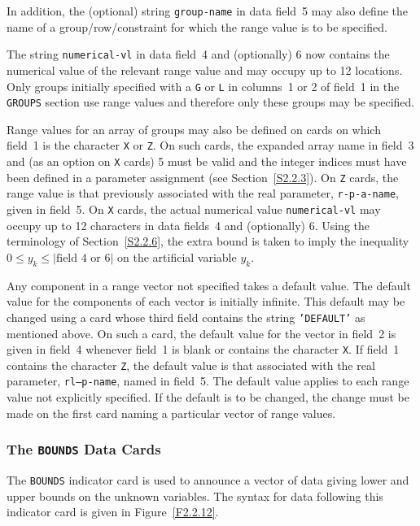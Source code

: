 \documentclass[a4paper]{article}
\begin{document}
In addition, the  (optional) string {\tt  group-name} in data field~5
may also define the name of a group/row/constraint
for which the range value is to be specified.

The string {\tt numerical-vl} in  data field~4 and (optionally) 6 now
contains the  numerical  value of the  relevant   range value and  may
occupy up to 12 locations.
Only groups initially specified with a {\tt G} or {\tt L} in columns~1
or 2 of  field~1 in  the {\tt  GROUPS}
section  use range  values
and therefore   only  these groups may  be specified.

Range values for an array
of groups may  also be  defined on cards
on which field~1 is the character {\tt X} or {\tt  Z}.  On such cards,
the expanded array name
in field~3 and (as an option  on  {\tt X} cards) 5
must be  valid  and the integer indices  must  have been defined  in a
parameter assignment (see Section~\ref{S2.2.3}).   On {\tt Z}  cards,
the range value
is that previously associated with the real parameter,
{\tt  r-p-a-name}, given in field~5.   On {\tt X} cards, the actual
numerical value {\tt numerical-vl} may occupy up to 12  characters in
data    fields~4 and (optionally)     6.  Using  the    terminology of
Section~\ref{S2.2.6}, the extra bound
is taken to imply the inequality
$0 \leq  y_k  \leq |\mbox{field~4 or  6}|$ on the  artificial variable
$y_k$.

Any component in  a range vector  not specified takes a default value.
The default   value for the components  of  each vector   is initially
infinite. This default may be changed  using  a card
whose third field
contains the string  {\tt 'DEFAULT'} as mentioned above.   On  such  a
card, the default value for the vector in field~2  is given in field~4
whenever field~1  is blank
or contains the   character {\tt  X}.  If
field~1  contains the  character  {\tt Z}, the default
value  is that
associated with the   real  parameter,
{\tt  rl--p-name}, named  in
field~5.  The default value applies to each range value
not explicitly
specified.  If the default is to be  changed, the  change must be made
on the first card
naming a particular vector of range values.

\subsubsection{\label{S2.2.12}The {\tt BOUNDS} Data Cards}

The {\tt BOUNDS}
indicator card is  used to announce  a vector of data
giving  lower and upper bounds on  the  unknown variables.
The syntax   for  data following  this  indicator   card  is given  in
Figure~\ref{F2.2.12}.
\end{document}
